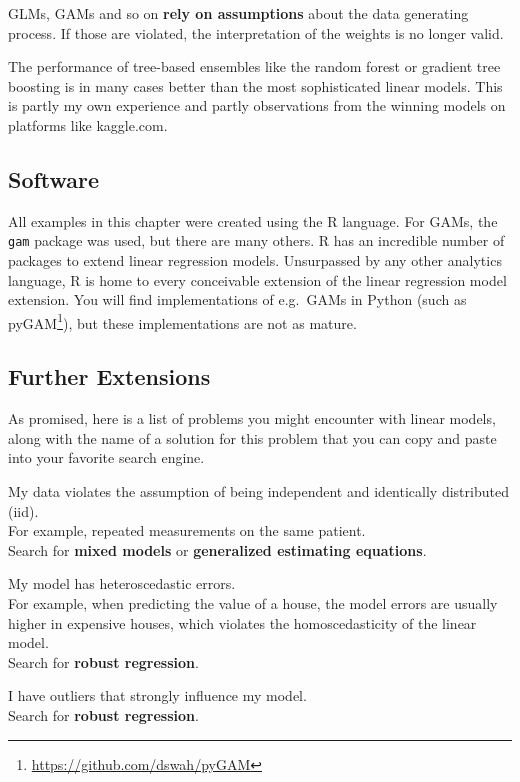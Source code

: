 \documentclass[
  12pt,
]{krantz}
\renewcommand{\href}[2]{#2\footnote{\url{#1}}}
\begin{document}
GLMs, GAMs and so on \textbf{rely on assumptions} about the data generating process.
If those are violated, the interpretation of the weights is no longer valid.

The performance of tree-based ensembles like the random forest or gradient tree boosting is in many cases better than the most sophisticated linear models.
This is partly my own experience and partly observations from the winning models on platforms like kaggle.com.

\hypertarget{software-1}{%
\subsection{Software}\label{software-1}}

All examples in this chapter were created using the R language.
For GAMs, the \texttt{gam} package was used, but there are many others.
R has an incredible number of packages to extend linear regression models.
Unsurpassed by any other analytics language, R is home to every conceivable extension of the linear regression model extension.
You will find implementations of e.g.~GAMs in Python (such as \href{https://github.com/dswah/pyGAM}{pyGAM}), but these implementations are not as mature.

\hypertarget{more-lm-extension}{%
\subsection{Further Extensions}\label{more-lm-extension}}

As promised, here is a list of problems you might encounter with linear models, along with the name of a solution for this problem that you can copy and paste into your favorite search engine.

My data violates the assumption of being independent and identically distributed (iid).\\
For example, repeated measurements on the same patient.\\
Search for \textbf{mixed models} or \textbf{generalized estimating equations}.

My model has heteroscedastic errors.\\
For example, when predicting the value of a house, the model errors are usually higher in expensive houses, which violates the homoscedasticity of the linear model.\\
Search for \textbf{robust regression}.

I have outliers that strongly influence my model.\\
Search for \textbf{robust regression}.
\end{document}

